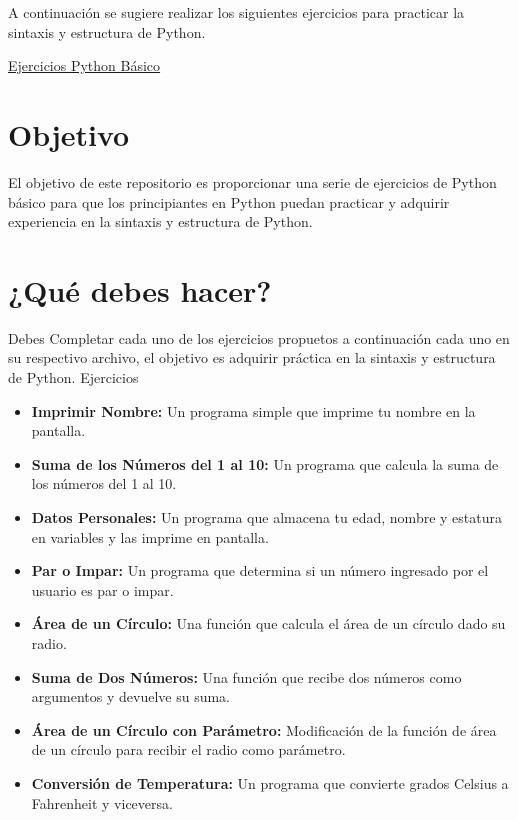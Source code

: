 \documentclass[
  a4paper,
  DIV=11,
  numbers=noendperiod,
  onepage,
  openany]{scrreprt}
\providecommand{\tightlist}{%
  \setlength{\itemsep}{0pt}\setlength{\parskip}{0pt}}\usepackage{longtable,booktabs,array}
\begin{document}
A continuación se sugiere realizar los siguientes ejercicios para
practicar la sintaxis y estructura de Python.

\href{https://classroom.github.com/a/LtHIKsxr}{Ejercicios Python Básico}

\section{Objetivo}\label{objetivo}

El objetivo de este repositorio es proporcionar una serie de ejercicios
de Python básico para que los principiantes en Python puedan practicar y
adquirir experiencia en la sintaxis y estructura de Python.

\section{¿Qué debes hacer?}\label{quuxe9-debes-hacer}

Debes Completar cada uno de los ejercicios propuetos a continuación cada
uno en su respectivo archivo, el objetivo es adquirir práctica en la
sintaxis y estructura de Python. Ejercicios

\begin{itemize}
\tightlist
\item
  \textbf{Imprimir Nombre:} Un programa simple que imprime tu nombre en
  la pantalla.
\item
  \textbf{Suma de los Números del 1 al 10:} Un programa que calcula la
  suma de los números del 1 al 10.
\item
  \textbf{Datos Personales:} Un programa que almacena tu edad, nombre y
  estatura en variables y las imprime en pantalla.
\item
  \textbf{Par o Impar:} Un programa que determina si un número ingresado
  por el usuario es par o impar.
\item
  \textbf{Área de un Círculo:} Una función que calcula el área de un
  círculo dado su radio.
\item
  \textbf{Suma de Dos Números:} Una función que recibe dos números como
  argumentos y devuelve su suma.
\item
  \textbf{Área de un Círculo con Parámetro:} Modificación de la función
  de área de un círculo para recibir el radio como parámetro.
\item
  \textbf{Conversión de Temperatura:} Un programa que convierte grados
  Celsius a Fahrenheit y viceversa.
\end{itemize}
\end{document}
